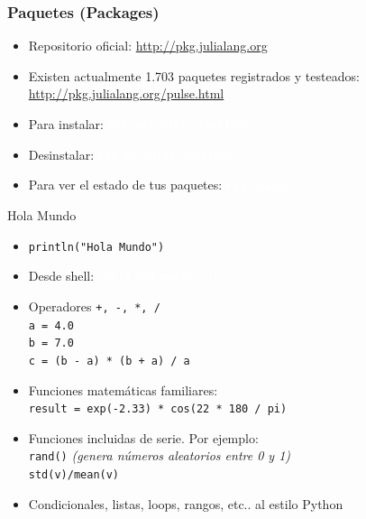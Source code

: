\documentclass{beamer}
\providecommand{\comando}[1]{\texttt{\colorbox{morado_w}{\textcolor{white}{#1}}}}
\begin{document}
\begin{frame}
\frametitle{Paquetes (Packages)}
\begin{itemize}
	\item Repositorio oficial: \url{http://pkg.julialang.org}
	\item Existen actualmente 1.703 paquetes registrados y testeados: \url{http://pkg.julialang.org/pulse.html}
	\item Para instalar: \comando{Pkg.add("Distributions")}
	\item Desinstalar: \comando{Pkg.rm("Distributions")}
	\item Para ver el estado de tus paquetes: \comando{Pkg.status()}
\end{itemize}
\end{frame}

\begin{frame}{Hola Mundo}
\begin{itemize}
	\item \texttt{println("Hola Mundo")}
	\item Desde shell: \comando{julia holamundo.jl}
	\item Operadores \texttt{+, -, *, /}\\
	\texttt{a = 4.0}\\
	\texttt{b = 7.0}\\
	\texttt{c = (b - a) * (b + a) / a}
	\item Funciones matemáticas familiares:\\
	\texttt{result = exp(-2.33) * cos(22 * 180 / pi)}
	\item Funciones incluidas de serie. Por ejemplo:\\
	\texttt{rand()} \textit{(genera números aleatorios entre 0 y 1)}\\
	\texttt{std(v)/mean(v)}
	\item Condicionales, listas, loops, rangos, etc.. al estilo Python
\end{itemize}
\end{frame}
\end{document}
